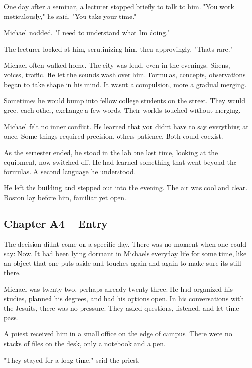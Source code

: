 \documentclass[
]{article}
\begin{document}
One day after a seminar, a lecturer stopped briefly to talk to him. "You work meticulously," he said. "You take your time."

Michael nodded. "I need to understand what I\textquotesingle m doing."

The lecturer looked at him, scrutinizing him, then approvingly. "That\textquotesingle s rare."

Michael often walked home. The city was loud, even in the evenings. Sirens, voices, traffic. He let the sounds wash over him. Formulas, concepts, observations began to take shape in his mind. It wasn\textquotesingle t a compulsion, more a gradual merging.

Sometimes he would bump into fellow college students on the street. They would greet each other, exchange a few words. Their worlds touched without merging.

Michael felt no inner conflict. He learned that you didn\textquotesingle t have to say everything at once. Some things required precision, others patience. Both could coexist.

As the semester ended, he stood in the lab one last time, looking at the equipment, now switched off. He had learned something that went beyond the formulas. A second language he understood.

He left the building and stepped out into the evening. The air was cool and clear. Boston lay before him, familiar yet open.

\subsection{Chapter A4 -- Entry}\label{chapter-a4-entry}

The decision didn\textquotesingle t come on a specific day. There was no moment when one could say: Now. It had been lying dormant in Michael\textquotesingle s everyday life for some time, like an object that one puts aside and touches again and again to make sure it\textquotesingle s still there.

Michael was twenty-two, perhaps already twenty-three. He had organized his studies, planned his degrees, and had his options open. In his conversations with the Jesuits, there was no pressure. They asked questions, listened, and let time pass.

A priest received him in a small office on the edge of campus. There were no stacks of files on the desk, only a notebook and a pen.

"They stayed for a long time," said the priest.
\end{document}
